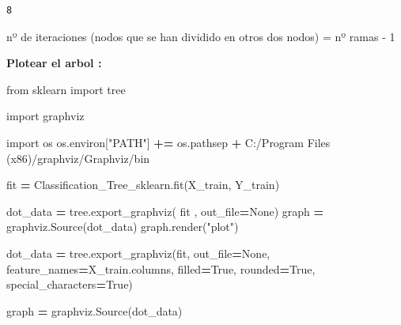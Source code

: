 \documentclass[
  11pt,
  a4paper,
]{article}
\newenvironment{Shaded}{\begin{snugshade}}{\end{snugshade}}
\newcommand{\ImportTok}[1]{#1}
\newcommand{\NormalTok}[1]{#1}
\newcommand{\OperatorTok}[1]{\textcolor[rgb]{0.81,0.36,0.00}{\textbf{#1}}}
\newcommand{\StringTok}[1]{\textcolor[rgb]{0.31,0.60,0.02}{#1}}
\newcommand{\VariableTok}[1]{\textcolor[rgb]{0.00,0.00,0.00}{#1}}
\begin{document}
\begin{verbatim}
8
\end{verbatim}

nº de iteraciones (nodos que se han dividido en otros dos nodos) = nº
ramas - 1

\newpage

\textbf{Plotear el arbol :}

\begin{Shaded}
\begin{Highlighting}[]
\ImportTok{from}\NormalTok{ sklearn }\ImportTok{import}\NormalTok{ tree}

\ImportTok{import}\NormalTok{ graphviz }

\ImportTok{import}\NormalTok{ os}
\NormalTok{os.environ[}\StringTok{"PATH"}\NormalTok{] }\OperatorTok{+=}\NormalTok{ os.pathsep }\OperatorTok{+} \StringTok{\textquotesingle{}C:/Program Files (x86)/graphviz/Graphviz/bin\textquotesingle{}}
\end{Highlighting}
\end{Shaded}

\begin{Shaded}
\begin{Highlighting}[]
\NormalTok{fit }\OperatorTok{=}\NormalTok{ Classification\_Tree\_sklearn.fit(X\_train, Y\_train)}

\NormalTok{dot\_data }\OperatorTok{=}\NormalTok{ tree.export\_graphviz( fit , out\_file}\OperatorTok{=}\VariableTok{None}\NormalTok{) }
\NormalTok{graph }\OperatorTok{=}\NormalTok{ graphviz.Source(dot\_data) }
\NormalTok{graph.render(}\StringTok{"plot"}\NormalTok{) }

\NormalTok{dot\_data }\OperatorTok{=}\NormalTok{ tree.export\_graphviz(fit, out\_file}\OperatorTok{=}\VariableTok{None}\NormalTok{, }
\NormalTok{                     feature\_names}\OperatorTok{=}\NormalTok{X\_train.columns,  }
\NormalTok{                     filled}\OperatorTok{=}\VariableTok{True}\NormalTok{, rounded}\OperatorTok{=}\VariableTok{True}\NormalTok{,  }
\NormalTok{                      special\_characters}\OperatorTok{=}\VariableTok{True}\NormalTok{)  }

\NormalTok{graph }\OperatorTok{=}\NormalTok{ graphviz.Source(dot\_data)  }
\end{Highlighting}
\end{Shaded}
\end{document}
